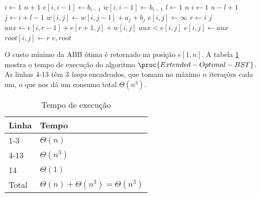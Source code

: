 \begin{codebox}
\li \For $i \gets 1$ \To $n + 1$
\li \Do
        $e[i, i-1] \gets b_{i-1}$
\li     $w[i, i-1] \gets b_{i-1}$
    \End
\li \For $l \gets 1$ \To $n$
\li \Do
        \For $i \gets 1$ \To $n - l + 1$
\li     \Do
            $j \gets i + l - 1$
\li         $w[i, j] \gets w[i, j-1] + a_j + b_j$
\li         $e[i, j] \gets \infty$
\li         \For $r \gets i$ \To $j$
\li         \Do
                $aux \gets e[i, r-1] + e[r+1, j] + w[i, j]$
\li             \If $aux < e[i, j]$
\li             \Then
                    $e[i, j] \gets aux$
\li                 $root[i, j] \gets r$
                \End
            \End
        \End 
    \End
\li \Return $e, root$
\end{codebox}

O custo mínimo da ABB ótima é retornado na posição $e[1, n]$. A tabela \ref{tbl:6-8-1} mostra o tempo de execução do algoritmo $\proc{Extended-Optimal-BST}$. As linhas 4-13 têm 3 \textit{loops} encadeados, que tomam no máximo $n$ iterações cada um, o que nos dá um consumo total $\Theta(n^3)$.

\begin{table}[H]
\centering
\begin{tabular}{|l|l|}
\hline
Linha                   & Tempo \\ \hline
1-3 & $\Theta(n)$ \\ \hline
4-13 & $\Theta(n^3)$ \\ \hline
14 & $\Theta(1)$ \\ \hline
Total & $\Theta(n) + \Theta(n^3) = \Theta(n^3)$ \\ \hline
\end{tabular}
\caption{Tempo de execução}
\label{tbl:6-8-1}
\end{table}